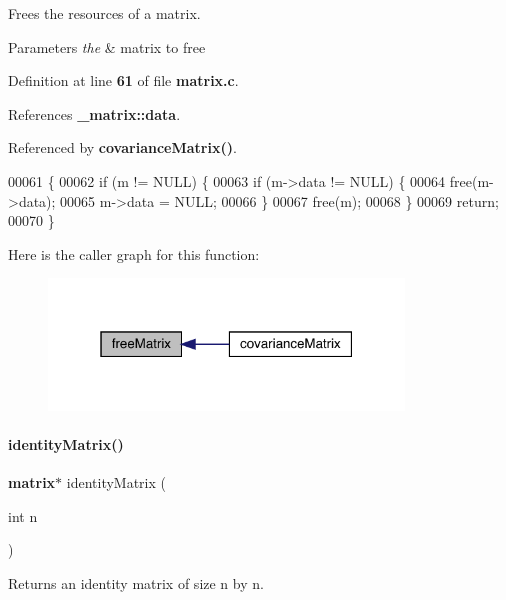 Frees the resources of a matrix. 


\begin{DoxyParams}{Parameters}
{\em the} & matrix to free \\
\hline
\end{DoxyParams}


Definition at line \textbf{ 61} of file \textbf{ matrix.\+c}.



References \textbf{ \+\_\+matrix\+::data}.



Referenced by \textbf{ covariance\+Matrix()}.


\begin{DoxyCode}
00061                            \{
00062   \textcolor{keywordflow}{if} (m != NULL) \{
00063     \textcolor{keywordflow}{if} (m->data != NULL) \{
00064       free(m->data);
00065       m->data = NULL;
00066     \}
00067     free(m);
00068   \}
00069   \textcolor{keywordflow}{return};
00070 \}
\end{DoxyCode}
Here is the caller graph for this function\+:
\nopagebreak
\begin{figure}[H]
\begin{center}
\leavevmode
\includegraphics[width=268pt]{matrix_8c_ae98365c910e9d688d2bdedec50d89a6b_icgraph}
\end{center}
\end{figure}
\mbox{\label{matrix_8c_aa3f5e409b1641373be7cf7284e216d1a}} 
\paragraph{identity\+Matrix()}
{\footnotesize\ttfamily \textbf{ matrix}$\ast$ identity\+Matrix (\begin{DoxyParamCaption}\item[{int}]{n }\end{DoxyParamCaption})}



Returns an identity matrix of size n by n. 


